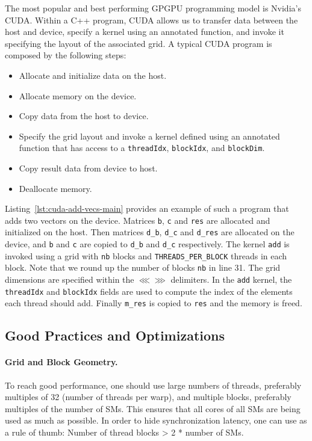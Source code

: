The most popular and best performing \gls{GPGPU} programming model is Nvidia's \gls{CUDA}. Within a C++ program, \gls{CUDA} allows us to transfer data between the host and device, specify a kernel using an annotated function, and invoke it specifying the layout of the associated grid. A typical \gls{CUDA} program is composed by the following steps:

\begin{itemize}
    \item Allocate and initialize data on the host.
    \item Allocate memory on the device.
    \item Copy data from the host to device.
    \item Specify the grid layout and invoke a kernel defined using an annotated function that has access to a \texttt{threadIdx}, \texttt{blockIdx}, and \texttt{blockDim}.
    \item Copy result data from device to host.
    \item Deallocate memory.
\end{itemize}

Listing~\ref{lst:cuda-add-vecs-main} provides an example of such a program that adds two vectors on the device. Matrices \texttt{b}, \texttt{c} and \texttt{res} are allocated and initialized on the host. Then matrices \texttt{d\_b}, \texttt{d\_c} and \texttt{d\_res} are allocated on the device, and \texttt{b} and \texttt{c} are copied to \texttt{d\_b} and \texttt{d\_c} respectively. The kernel \texttt{add} is invoked using a grid with \texttt{nb} blocks and \texttt{THREADS\_PER\_BLOCK} threads in each block. Note that we round up the number of blocks \texttt{nb} in line 31. The grid dimensions are specified within the $\lll \ggg$ delimiters. In the \texttt{add} kernel, the \texttt{threadIdx} and \texttt{blockIdx} fields are used to compute the index of the elements each thread should add. Finally \texttt{m\_res} is copied to \texttt{res} and the memory is freed.

\subsection{Good Practices and Optimizations}

    \paragraph{\textbf{Grid and Block Geometry}.} To reach good performance, one should use large numbers of threads, preferably multiples of 32 (number of threads per warp), and multiple blocks, preferably multiples of the number of \gls{SM}s. This ensures that all cores of all \gls{SM}s are being used as much as possible. In order to hide synchronization latency, one can use as a rule of thumb: Number of thread blocks > 2 * number of \gls{SM}s.

